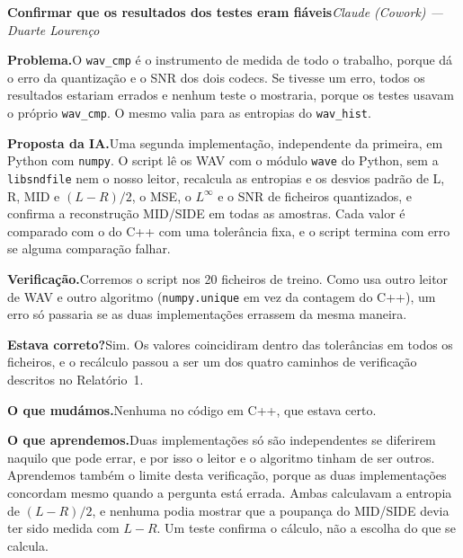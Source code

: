 \documentclass[a4paper,11pt]{article}
\newcommand{\prog}[1]{\texttt{#1}}
\newcommand{\caso}[3]{%
  \par\medskip\noindent\textbf{#1}\hfill{\small\textit{#2 --- #3}}\par\nopagebreak\smallskip}
\newcommand{\campo}[2]{\noindent\textbf{#1}\enspace #2\par}
\newcommand{\problema}[1]{\campo{Problema.}{#1}}
\newcommand{\proposta}[1]{\campo{Proposta da IA.}{#1}}
\newcommand{\verificacao}[1]{\campo{Verificação.}{#1}}
\newcommand{\correto}[1]{\campo{Estava correto?}{#1}}
\newcommand{\alteracoes}[1]{\campo{O que mudámos.}{#1}}
\newcommand{\aprendizagem}[1]{\campo{O que aprendemos.}{#1}}
\begin{document}
\caso{Confirmar que os resultados dos testes eram fiáveis}{Claude (Cowork)}{Duarte Lourenço}
\problema{O \prog{wav\_cmp} é o instrumento de medida de todo o trabalho, porque
dá o erro da quantização e o SNR dos dois codecs. Se tivesse um erro, todos os
resultados estariam errados e nenhum teste o mostraria, porque os testes usavam
o próprio \prog{wav\_cmp}. O mesmo valia para as entropias do \prog{wav\_hist}.}
\proposta{Uma segunda implementação, independente da primeira, em Python com
\prog{numpy}. O script lê os WAV com o módulo \texttt{wave} do Python, sem a
\texttt{libsndfile} nem o nosso leitor, recalcula as entropias e os desvios
padrão de L, R, MID e $(L-R)/2$, o MSE, o $L^\infty$ e o SNR de ficheiros
quantizados, e confirma a reconstrução MID/SIDE em todas as amostras. Cada
valor é comparado com o do C++ com uma tolerância fixa, e o script termina com
erro se alguma comparação falhar.}
\verificacao{Corremos o script nos 20 ficheiros de treino. Como usa outro
leitor de WAV e outro algoritmo (\texttt{numpy.unique} em vez da contagem do
C++), um erro só passaria se as duas implementações errassem da mesma maneira.}
\correto{Sim. Os valores coincidiram dentro das tolerâncias em todos os
ficheiros, e o recálculo passou a ser um dos quatro caminhos de verificação
descritos no Relatório~1.}
\alteracoes{Nenhuma no código em C++, que estava certo.}
\aprendizagem{Duas implementações só são independentes se diferirem naquilo que
pode errar, e por isso o leitor e o algoritmo tinham de ser outros. Aprendemos
também o limite desta verificação, porque as duas implementações concordam mesmo
quando a pergunta está errada. Ambas calculavam a entropia de $(L-R)/2$, e
nenhuma podia mostrar que a poupança do MID/SIDE devia ter sido medida com
$L-R$. Um teste confirma o cálculo, não a escolha do que se calcula.}

\bigskip
\bigskip
\bigskip
\end{document}
